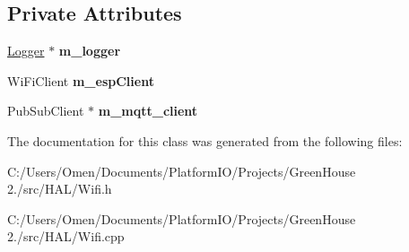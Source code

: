 \subsection*{Private Attributes}
\begin{DoxyCompactItemize}
\item 
\mbox{\label{class_h_a_l_1_1_wifi_ae09c5bcee7bf07099f81e745659b570a}} 
\hyperlink{class_logger}{Logger} $\ast$ {\bfseries m\+\_\+logger}
\item 
\mbox{\label{class_h_a_l_1_1_wifi_a80b423b32d2cfbd2661784f706728aac}} 
Wi\+Fi\+Client {\bfseries m\+\_\+esp\+Client}
\item 
\mbox{\label{class_h_a_l_1_1_wifi_a197b785e5c719d7490e698a406c26465}} 
Pub\+Sub\+Client $\ast$ {\bfseries m\+\_\+mqtt\+\_\+client}
\end{DoxyCompactItemize}


The documentation for this class was generated from the following files\+:\begin{DoxyCompactItemize}
\item 
C\+:/\+Users/\+Omen/\+Documents/\+Platform\+I\+O/\+Projects/\+Green\+House 2./src/\+H\+A\+L/Wifi.\+h\item 
C\+:/\+Users/\+Omen/\+Documents/\+Platform\+I\+O/\+Projects/\+Green\+House 2./src/\+H\+A\+L/Wifi.\+cpp\end{DoxyCompactItemize}

